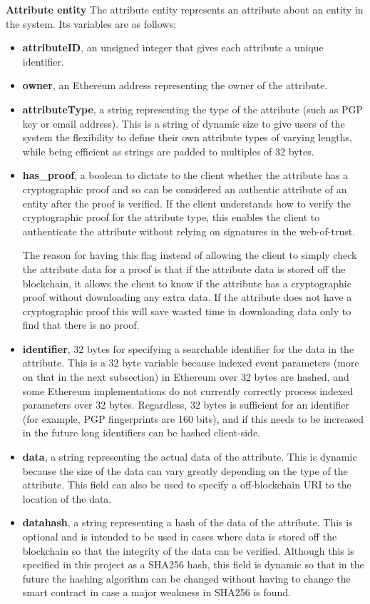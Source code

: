\documentclass[12pt]{report}
\begin{document}
	\bigskip
	\noindent \textbf{Attribute entity}\newline
	The attribute entity represents an attribute about an entity in the system. Its variables are as follows:
	\begin{itemize}
		\item \textbf{attributeID}, an unsigned integer that gives each attribute a unique identifier.
		\item \textbf{owner}, an Ethereum address representing the owner of the attribute.
		\item \textbf{attributeType}, a string representing the type of the attribute (such as PGP key or email address). This is a string of dynamic size to give users of the system the flexibility to define their own attribute types of varying lengths, while being efficient as strings are padded to multiples of 32 bytes\cite{14}.
		\item \textbf{has\_proof}, a boolean to dictate to the client whether the attribute has a cryptographic proof and so can be considered an authentic attribute of an entity after the proof is verified. If the client understands how to verify the cryptographic proof for the attribute type, this enables the client to authenticate the attribute without relying on signatures in the web-of-trust.
		
		The reason for having this flag instead of allowing the client to simply check the attribute data for a proof is that if the attribute data is stored off the blockchain, it allows the client to know if the attribute has a cryptographic proof without downloading any extra data. If the attribute does not have a cryptographic proof this will save wasted time in downloading data only to find that there is no proof.
		\item \textbf{identifier}, 32 bytes for specifying a searchable identifier for the data in the attribute. This is a 32 byte variable because indexed event parameters (more on that in the next subsection) in Ethereum over 32 bytes are hashed, and some Ethereum implementations do not currently correctly process indexed parameters over 32 bytes. Regardless, 32 bytes is sufficient for an identifier (for example, PGP fingerprints are 160 bits\cite{15}), and if this needs to be increased in the future long identifiers can be hashed client-side.
		\item \textbf{data}, a string representing the actual data of the attribute. This is dynamic because the size of the data can vary greatly depending on the type of the attribute. This field can also be used to specify a off-blockchain URI to the location of the data.
		\item \textbf{datahash}, a string representing a hash of the data of the attribute. This is optional and is intended to be used in cases where data is stored off the blockchain so that the integrity of the data can be verified. Although this is specified in this project as a SHA256 hash, this field is dynamic so that in the future the hashing algorithm can be changed without having to change the smart contract in case a major weakness in SHA256 is found.
	\end{itemize}
	
\end{document}
